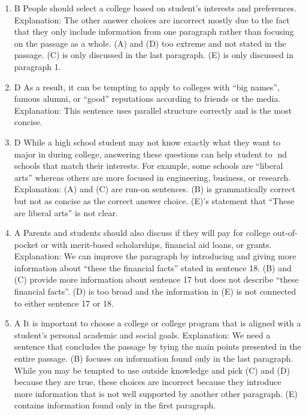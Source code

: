 \begin{enumerate}
\item B People should select a college based on student's interests and preferences. Explanation: The other answer choices are incorrect mostly due to the fact that they only include information from one paragraph rather than focusing on the passage as a whole. (A) and (D) too extreme and not stated in the passage. (C) is only discussed in the last paragraph. (E) is only discussed in paragraph 1. 
\item D As a result, it can be tempting to apply to colleges with ``big names'', famous alumni, or ``good'' reputations according to friends or the media. Explanation: This sentence uses parallel structure correctly and is the most concise. 
\item D While a high school student may not know exactly what they want to major in during college, answering these questions can help student to nd schools that match their interests. For example, some schools are ``liberal arts'' whereas others are more focused in engineering, business, or research. Explanation: (A) and (C) are run-on sentences. (B) is grammatically correct but not as concise as the correct answer choice. (E)'s statement that ``These are liberal arts'' is not clear.
\item A Parents and students should also discuss if they will pay for college out-of-pocket or with merit-based scholarships, financial aid loans, or grants. Explanation: We can improve the paragraph by introducing and giving more information about ``these the financial facts'' stated in sentence 18. (B) and (C) provide more information about sentence 17 but does not describe ``these financial facts''. (D) is too broad and the information in (E) is not connected to either sentence 17 or 18.
\item A It is important to choose a college or college program that is aligned with a student's personal academic and social goals. Explanation:  We need a sentence that concludes the passage by tying the main points presented in the entire passage. (B) focuses on information found only in the last paragraph. While you may be tempted to use outside knowledge and pick (C) and (D) because they are true, these choices are incorrect because they introduce more information that is not well supported by another other paragraph. (E) contains information found only in the first paragraph. 
\end{enumerate}